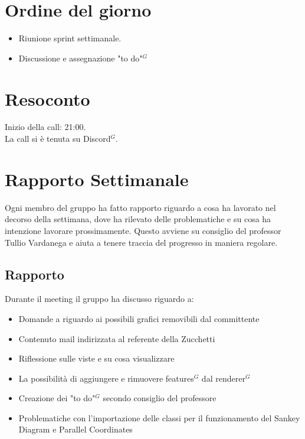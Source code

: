 \section{Ordine del giorno}

\begin{itemize}
	\item Riunione sprint settimanale.
    \item Discussione e assegnazione "to do"$^{G}$ 
\end{itemize}

\section{Resoconto}
\label{sec:Resoconto}

\noindent
Inizio della call: 21:00. \\
\noindent La call si è tenuta su Discord$^{G}$.
\section{Rapporto Settimanale}
Ogni membro del gruppo ha fatto rapporto riguardo a cosa ha lavorato nel decorso della settimana, dove ha rilevato delle problematiche e su cosa ha intenzione lavorare prossimamente.
Questo avviene su consiglio del professor Tullio Vardanega e aiuta a tenere traccia del progresso in maniera regolare.

\subsection{Rapporto}
Durante il meeting il gruppo ha discusso riguardo a:
\begin{itemize}
	\item Domande a riguardo ai possibili grafici removibili dal committente
    \item Contenuto mail indirizzata al referente della Zucchetti
	\item Riflessione sulle viste e su cosa visualizzare
	\item La possibilità di aggiungere e rimuovere features$^{G}$ dal renderer$^{G}$
	\item Creazione dei "to do"$^{G}$ secondo consiglio del professore
	\item Problematiche con l'importazione delle classi per il funzionamento del Sankey Diagram e Parallel Coordinates
\end{itemize}

